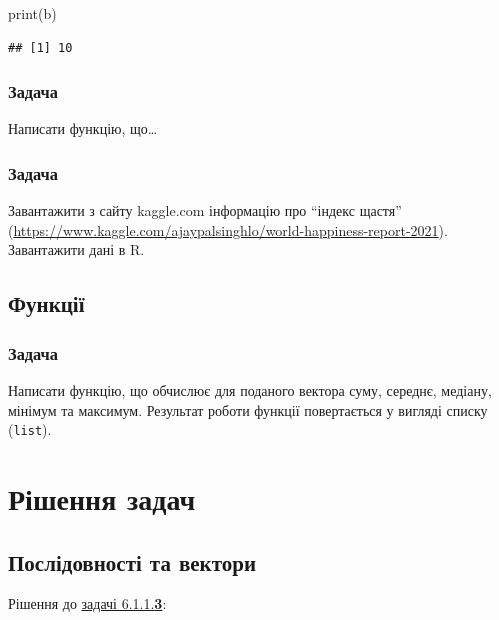 \documentclass[
]{book}
\newenvironment{Shaded}{\begin{snugshade}}{\end{snugshade}}
\newcommand{\FunctionTok}[1]{\textcolor[rgb]{0.00,0.00,0.00}{#1}}
\newcommand{\NormalTok}[1]{#1}
\begin{document}
\begin{Shaded}
\begin{Highlighting}[]
\FunctionTok{print}\NormalTok{(b)}
\end{Highlighting}
\end{Shaded}

\begin{verbatim}
## [1] 10
\end{verbatim}

\hypertarget{task6123}{%
\subsubsection{Задача}\label{task6123}}

Написати функцію, що\ldots{}

\hypertarget{task6124}{%
\subsubsection{Задача}\label{task6124}}

Завантажити з сайту kaggle.com інформацію про ``індекс щастя'' (\url{https://www.kaggle.com/ajaypalsinghlo/world-happiness-report-2021}). Завантажити дані в R.

\hypertarget{chapter612}{%
\subsection{Функції}\label{chapter612}}

\hypertarget{task612}{%
\subsubsection{Задача}\label{task612}}

Написати функцію, що обчислює для поданого вектора суму, середнє, медіану, мінімум та максимум. Результат роботи функції повертається у вигляді списку (\texttt{list}).

\hypertarget{chapter62}{%
\section{Рішення задач}\label{chapter62}}

\hypertarget{chapter621}{%
\subsection{Послідовності та вектори}\label{chapter621}}

Рішення до \protect\hyperlink{task6113}{задачі 6.1.1.\textbf{3}}:
\end{document}
